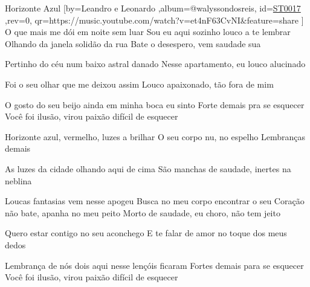 \beginsong
{Horizonte Azul %
}[by={Leandro e Leonardo %
},album={@walyssondosreis},
id={\href{https://music.youtube.com/watch?v=et4nF63CvNI&feature=share %
}{ST0017 %
}},rev={0}, %
qr={https://music.youtube.com/watch?v=et4nF63CvNI&feature=share %
}]
\beginverse
O que mais me dói em noite sem luar
Sou eu aqui sozinho louco a te lembrar
Olhando da janela solidão da rua
Bate o desespero, vem saudade sua
\endverse

\beginverse
Pertinho do céu num baixo astral danado
Nesse apartamento, eu louco alucinado
\endverse

\beginverse
Foi o seu olhar que me deixou assim
Louco apaixonado, tão fora de mim
\endverse

\beginverse
O gosto do seu beijo ainda em minha boca eu sinto
Forte demais pra se esquecer
Você foi ilusão, virou paixão difícil de esquecer
\endverse

\beginchorus
Horizonte azul, vermelho, luzes a brilhar
O seu corpo nu, no espelho
Lembranças demais
\endchorus

\beginverse
As luzes da cidade olhando aqui de cima
São manchas de saudade, inertes na neblina
\endverse

\beginverse
Loucas fantasias vem nesse apogeu
Busca no meu corpo encontrar o seu
Coração não bate, apanha no meu peito
Morto de saudade, eu choro, não tem jeito
\endverse

\beginverse
Quero estar contigo no seu aconchego
E te falar de amor no toque dos meus dedos
\endverse

\beginverse
Lembrança de nós dois aqui nesse lençóis ficaram
Fortes demais para se esquecer
Você foi ilusão, virou paixão difícil de esquecer
\endverse


